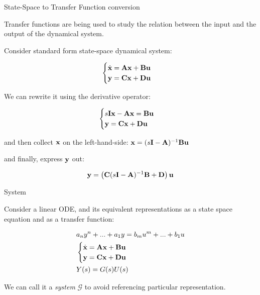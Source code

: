 \documentclass{beamer}
\begin{document}
\begin{frame}{State-Space to Transfer Function conversion}
\begin{flushleft}

Transfer functions are being used to study the relation between the input and the output of the dynamical system.

\bigskip

Consider standard form state-space dynamical system:

\begin{equation}
\begin{cases}
\dot{\mathbf{x}} = \mathbf{A}\mathbf{x} + \mathbf{B}\mathbf{u} \\
     \mathbf{y}  = \mathbf{C}\mathbf{x} + \mathbf{D}\mathbf{u}
\end{cases}
\end{equation}

We can rewrite it using the derivative operator:

\begin{equation}
\begin{cases}
s\mathbf{I}\mathbf{x} -\mathbf{A}\mathbf{x} = \mathbf{B}\mathbf{u} \\
\mathbf{y}  = \mathbf{C}\mathbf{x} + \mathbf{D}\mathbf{u}
\end{cases}
\end{equation}

and then collect $\mathbf{x}$ on the left-hand-side: $\mathbf{x} = (s\mathbf{I} -\mathbf{A})^{-1} \mathbf{B}\mathbf{u}$

and finally, express $\mathbf{y}$ out:

\begin{equation}
\mathbf{y}  = \left( \mathbf{C}(s\mathbf{I} -\mathbf{A})^{-1} \mathbf{B} + \mathbf{D} \right) \mathbf{u}
\end{equation}

\end{flushleft}
\end{frame}





\begin{frame}{System}
	\begin{flushleft}
		
		Consider a linear ODE, and its equivalent representations as a state space equation and as a transfer function:
		
		\begin{align}
			&a_n y^n + ... + a_1 y = b_m u^m + ... + b_1 u
			\\
			&\begin{cases}
				\dot{\mathbf{x}} = \mathbf{A}\mathbf{x} + \mathbf{B}\mathbf{u} \\
				\mathbf{y}  = \mathbf{C}\mathbf{x} + \mathbf{D}\mathbf{u}
			\end{cases}
		\\
		&Y(s)  = G(s) U(s)
		\end{align}
		
		We can call it a \emph{system} $\mathcal{G}$ to avoid referencing particular representation.
		
	\end{flushleft}
\end{frame}
\end{document}
